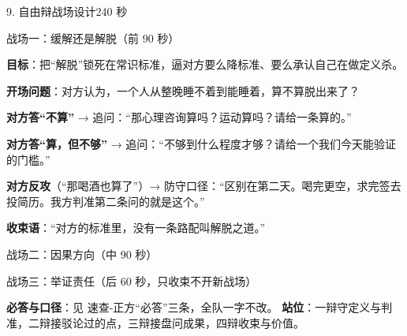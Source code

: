 \documentclass[script,pro]{debate}
\begin{document}
\begin{stage}{9. 自由辩战场设计}{240 秒}
\begin{battleground}{战场一：缓解还是解脱（前 90 秒）}
\begin{bullets}
\item \textbf{目标}：把“解脱”锁死在常识标准，逼对方要么降标准、要么承认自己在做定义杀。
\item \textbf{开场问题}：对方认为，一个人从整晚睡不着到能睡着，算不算脱出来了？
\item \textbf{对方答“不算”} → 追问：“那心理咨询算吗？运动算吗？请给一条算的。”
\item \textbf{对方答“算，但不够”} → 追问：“不够到什么程度才够？请给一个我们今天能验证的门槛。”
\item \textbf{对方反攻}（“那喝酒也算了”）→ 防守口径：“区别在第二天。喝完更空，求完签去投简历。我方判准第二条问的就是这个。”
\item \textbf{收束语}：“对方的标准里，没有一条路配叫解脱之道。”
\end{bullets}
\end{battleground}
\begin{battleground}{战场二：因果方向（中 90 秒）}
\begin{fields}
\end{fields}
\end{battleground}
\begin{battleground}{战场三：举证责任（后 60 秒，只收束不开新战场）}
\begin{fields}
\end{fields}
\textbf{必答与口径}：见 速查-正方“必答”三条，全队一字不改。
\textbf{站位}：一辩守定义与判准，二辩接驳论过的点，三辩接盘问成果，四辩收束与价值。
\end{battleground}
\end{stage}
\end{document}
